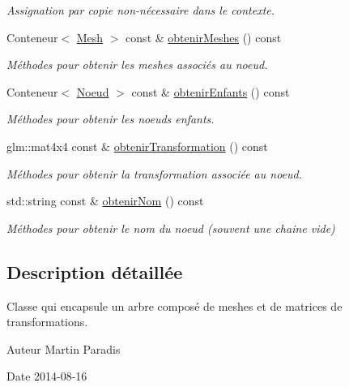 \begin{DoxyCompactItemize}
\begin{DoxyCompactList}\small\item\em Assignation par copie non-\/nécessaire dans le contexte. \end{DoxyCompactList}\item 
Conteneur$<$ \hyperlink{classmodele_1_1_mesh}{Mesh} $>$ const \& \hyperlink{classmodele_1_1_noeud_a101a25623ebba2600f8543a6c19679e0}{obtenir\-Meshes} () const 
\begin{DoxyCompactList}\small\item\em Méthodes pour obtenir les meshes associés au noeud. \end{DoxyCompactList}\item 
Conteneur$<$ \hyperlink{classmodele_1_1_noeud}{Noeud} $>$ const \& \hyperlink{classmodele_1_1_noeud_a6963aeb02dc79278f93e83f0289c8d0f}{obtenir\-Enfants} () const 
\begin{DoxyCompactList}\small\item\em Méthodes pour obtenir les noeuds enfants. \end{DoxyCompactList}\item 
glm\-::mat4x4 const \& \hyperlink{classmodele_1_1_noeud_a87e5e968095dc830b8f1a008453f816f}{obtenir\-Transformation} () const 
\begin{DoxyCompactList}\small\item\em Méthodes pour obtenir la transformation associée au noeud. \end{DoxyCompactList}\item 
std\-::string const \& \hyperlink{classmodele_1_1_noeud_a92bd556c458afa1a690b7b253a6557fd}{obtenir\-Nom} () const 
\begin{DoxyCompactList}\small\item\em Méthodes pour obtenir le nom du noeud (souvent une chaine vide) \end{DoxyCompactList}\end{DoxyCompactItemize}


\subsection{Description détaillée}
Classe qui encapsule un arbre composé de meshes et de matrices de transformations. 

\begin{DoxyAuthor}{Auteur}
Martin Paradis 
\end{DoxyAuthor}
\begin{DoxyDate}{Date}
2014-\/08-\/16 
\end{DoxyDate}


